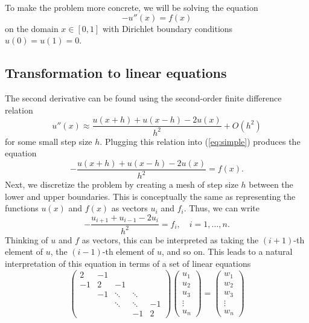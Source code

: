 \documentclass{article}
\begin{document}
    To make the problem more concrete, we will be solving the equation
    \begin{equation}
        -u''(x) = f(x)  \label{eq:simple}
    \end{equation}
    on the domain $x \in [0, 1]$ with Dirichlet boundary conditions $u(0) = u(1) = 0$.

    \subsection{Transformation to linear equations}

        The second derivative can be found using the second-order finite difference relation
        \begin{equation}
            u''(x) \approx \frac{u(x+h) + u(x-h) - 2u(x)}{h^2} + O(h^2)  \label{eq:finite}
        \end{equation}
        for some small step size $h$. Plugging this relation into (\ref{eq:simple}) produces the equation
        \begin{equation}
            -\frac{u(x+h) + u(x-h) - 2u(x)}{h^2} = f(x).
        \end{equation}
        Next, we discretize the problem by creating a mesh of step size $h$ between the lower and upper boundaries. This is conceptually the same as representing the functions $u(x)$ and $f(x)$ as vectors $u_i$ and $f_i$. Thus, we can write
        \begin{equation}
            -\frac{u_{i+1} + u_{i-1} - 2u_i}{h^2} = f_i, \quad i = 1, \dots, n.
        \end{equation}
        Thinking of $u$ and $f$ as vectors, this can be interpreted as taking the $(i+1)$-th element of $u$, the $(i-1)$-th element of $u$, and so on. This leads to a natural interpretation of this equation in terms of a set of linear equations
        \begin{equation}
            \begin{pmatrix}
                 2 & -1 &        &        &    \\
                -1 &  2 & -1     &        &    \\
                   & -1 & \ddots & \ddots &    \\
                   &    & \ddots & \ddots & -1 \\
                   &    &        & -1     &  2
            \end{pmatrix}
            \begin{pmatrix}
                u_1 \\ u_2 \\ u_3 \\ \vdots \\ u_n
            \end{pmatrix}
            =
            \begin{pmatrix}
                w_1 \\ w_2 \\ w_3 \\ \vdots \\ w_n
            \end{pmatrix}
            \label{eq:oursystem}
        \end{equation}
\end{document}
